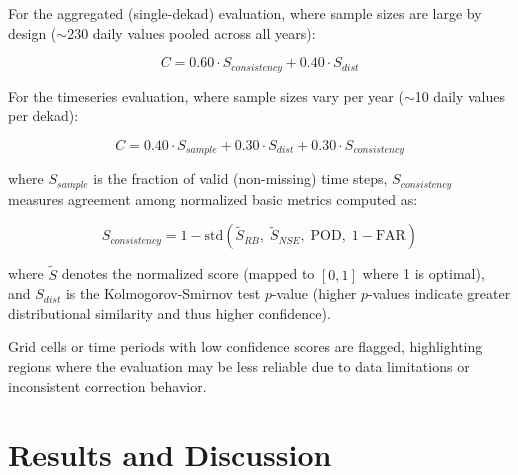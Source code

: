 \documentclass[11pt,a4paper]{article}
\begin{document}
For the aggregated (single-dekad) evaluation, where sample sizes are
large by design ($\sim$230 daily values pooled across all years):

\begin{equation}C = 0.60 \cdot S_{consistency} + 0.40 \cdot S_{dist}\end{equation}

For the timeseries evaluation, where sample sizes vary per year
($\sim$10 daily values per dekad):

\begin{equation}C = 0.40 \cdot S_{sample} + 0.30 \cdot S_{dist} + 0.30 \cdot S_{consistency}\end{equation}

where \(S_{sample}\) is the fraction of valid (non-missing) time steps,
\(S_{consistency}\) measures agreement among normalized basic metrics
computed as:

\begin{equation}S_{consistency} = 1 - \text{std}\left(\tilde{S}_{RB}, \; \tilde{S}_{NSE}, \; \text{POD}, \; 1 - \text{FAR}\right)\end{equation}

where \(\tilde{S}\) denotes the normalized score (mapped to \([0, 1]\)
where 1 is optimal), and \(S_{dist}\) is the Kolmogorov-Smirnov test
\(p\)-value (higher \(p\)-values indicate greater distributional
similarity and thus higher confidence).

Grid cells or time periods with low confidence scores are flagged,
highlighting regions where the evaluation may be less reliable due to
data limitations or inconsistent correction behavior.

\section{Results and Discussion}\label{results-and-discussion}
\end{document}
